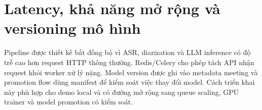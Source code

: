 \section{Latency, khả năng mở rộng và versioning mô hình}

Pipeline được thiết kế bất đồng bộ vì ASR, diarization và LLM inference có độ trễ cao hơn request HTTP thông thường. Redis/Celery cho phép tách API nhận request khỏi worker xử lý nặng. Model version được ghi vào metadata meeting và promotion flow dùng manifest để kiểm soát việc thay đổi model. Cách triển khai này phù hợp cho demo local và có đường mở rộng sang queue scaling, GPU trainer và model promotion có kiểm soát.
